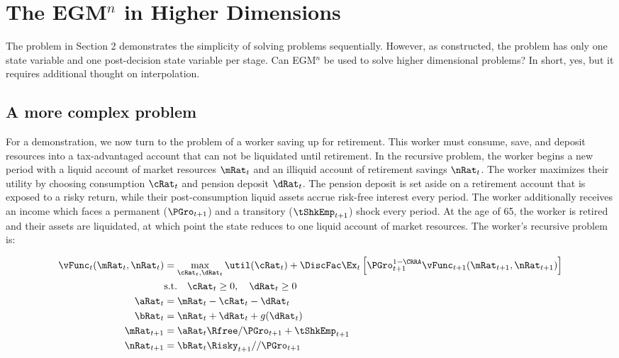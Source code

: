 \documentclass[\econtexRoot/SequentialEGM]{subfiles}
\begin{document}
\hypertarget{higher-dimensions}{}
\par\section{The EGM$^n$ in Higher Dimensions}
\notinsubfile{\label{sec:higherdims}}

The problem in Section 2 demonstrates the simplicity of solving problems sequentially. However, as constructed, the problem has only one state variable and one post-decision state variable per stage. Can EGM$^n$ be used to solve higher dimensional problems? In short, yes, but it requires additional thought on interpolation.

\subsection{A more complex problem}



For a demonstration, we now turn to the problem of a worker saving up for retirement. This worker must consume, save, and deposit resources into a tax-advantaged account that can not be liquidated until retirement. In the recursive problem, the worker begins a new period with a liquid account of market resources $\mRat_{t}$ and an illiquid account of retirement savings $\nRat_{t}$. The worker maximizes their utility by choosing consumption $\cRat_{t}$ and pension deposit $\dRat_{t}$. The pension deposit is set aside on a retirement account that is exposed to a risky return, while their post-consumption liquid assets accrue risk-free interest every period. The worker additionally receives an income which faces a permanent ($\PGro_{t+1}$) and a transitory ($\tShkEmp_{t+1}$) shock every period. At the age of 65, the worker is retired and their assets are liquidated, at which point the state reduces to one liquid account of market resources. The worker's recursive problem is:

\begin{equation}
    \begin{split}
        \vFunc_{t}(\mRat_{t}, \nRat_{t}) & = \max_{\cRat_{t}, \dRat_{t}} \util(\cRat_{t}) + \DiscFac \Ex_{t} \left[ \PGro_{t+1}^{1-\CRRA} \vFunc_{t+1}(\mRat_{t+1}, \nRat_{t+1}) \right] \\
        & \text{s.t.} \quad \cRat_{t} \ge 0, \quad \dRat_{t} \ge 0 \\
        \aRat_{t} & = \mRat_{t} - \cRat_{t} - \dRat_{t} \\
        \bRat_{t} & = \nRat_{t} + \dRat_{t} + g(\dRat_{t}) \\
        \mRat_{t+1} & = \aRat_{t} \Rfree / \PGro_{t+1}  + \tShkEmp_{t+1} \\
        \nRat_{t+1} & = \bRat_{t} \Risky_{t+1} / / \PGro_{t+1}
    \end{split}
\end{equation}
\end{document}
